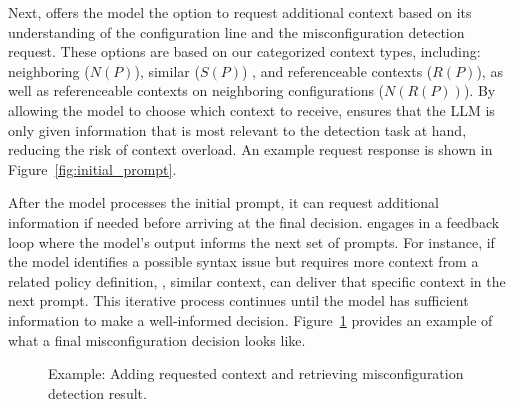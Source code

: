  Next, \sysname{} offers the model the option to request additional context based on its understanding of the configuration line and the misconfiguration detection request. These options are based on our categorized context types, including: neighboring (\( N(P) \)), similar (\(S(P) \)) , and referenceable contexts (\( R(P) \)), as well as referenceable contexts on neighboring configurations (\( N(R(P)) \)). By allowing the model to choose which context to receive, \sysname{} ensures that the LLM is only given information that is most relevant to the detection task at hand, reducing the risk of context overload. An example request response is shown in Figure~\ref{fig:initial_prompt}.
    
 After the model processes the initial prompt, it can request additional information if needed before arriving at the final decision. \sysname{} engages in a feedback loop where the model’s output informs the next set of prompts. For instance, if the model identifies a possible syntax issue but requires more context from a related policy definition, \ie, similar context, \sysname{} can deliver that specific context in the next prompt. This iterative process continues until the model has sufficient information to make a well-informed decision. Figure~\ref{fig:feedback_and_response} provides an example of what a final misconfiguration decision looks like.
    \begin{figure}[tb]
    \centering
    \caption{Example: Adding requested context and retrieving misconfiguration detection result.}
    \label{fig:feedback_and_response}
\end{figure}



